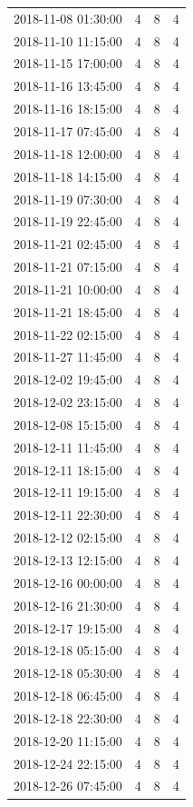 \begin{tabular}{lrrr}
2018-11-08 01:30:00 & 4 & 8 & 4 \\
2018-11-10 11:15:00 & 4 & 8 & 4 \\
2018-11-15 17:00:00 & 4 & 8 & 4 \\
2018-11-16 13:45:00 & 4 & 8 & 4 \\
2018-11-16 18:15:00 & 4 & 8 & 4 \\
2018-11-17 07:45:00 & 4 & 8 & 4 \\
2018-11-18 12:00:00 & 4 & 8 & 4 \\
2018-11-18 14:15:00 & 4 & 8 & 4 \\
2018-11-19 07:30:00 & 4 & 8 & 4 \\
2018-11-19 22:45:00 & 4 & 8 & 4 \\
2018-11-21 02:45:00 & 4 & 8 & 4 \\
2018-11-21 07:15:00 & 4 & 8 & 4 \\
2018-11-21 10:00:00 & 4 & 8 & 4 \\
2018-11-21 18:45:00 & 4 & 8 & 4 \\
2018-11-22 02:15:00 & 4 & 8 & 4 \\
2018-11-27 11:45:00 & 4 & 8 & 4 \\
2018-12-02 19:45:00 & 4 & 8 & 4 \\
2018-12-02 23:15:00 & 4 & 8 & 4 \\
2018-12-08 15:15:00 & 4 & 8 & 4 \\
2018-12-11 11:45:00 & 4 & 8 & 4 \\
2018-12-11 18:15:00 & 4 & 8 & 4 \\
2018-12-11 19:15:00 & 4 & 8 & 4 \\
2018-12-11 22:30:00 & 4 & 8 & 4 \\
2018-12-12 02:15:00 & 4 & 8 & 4 \\
2018-12-13 12:15:00 & 4 & 8 & 4 \\
2018-12-16 00:00:00 & 4 & 8 & 4 \\
2018-12-16 21:30:00 & 4 & 8 & 4 \\
2018-12-17 19:15:00 & 4 & 8 & 4 \\
2018-12-18 05:15:00 & 4 & 8 & 4 \\
2018-12-18 05:30:00 & 4 & 8 & 4 \\
2018-12-18 06:45:00 & 4 & 8 & 4 \\
2018-12-18 22:30:00 & 4 & 8 & 4 \\
2018-12-20 11:15:00 & 4 & 8 & 4 \\
2018-12-24 22:15:00 & 4 & 8 & 4 \\
2018-12-26 07:45:00 & 4 & 8 & 4 \\

\end{tabular}
